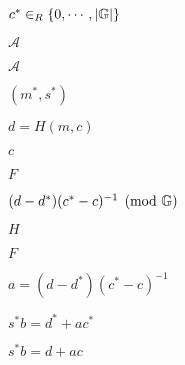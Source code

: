 \documentclass[10pt]{book}
\begin{document}
\begin{mdSnippets}
\begin{mdInlineSnippet}[49c145525d29d15a616c70c43bff860b]
$c^* \in_R \{0, \cdots, |\mathbb{G}|\}$\end{mdInlineSnippet}%
\begin{mdInlineSnippet}[ad70146b431bea9ae74cf8385470c544]%
$\mathcal{A}$\end{mdInlineSnippet}%
\begin{mdInlineSnippet}[ad70146b431bea9ae74cf8385470c544]%
$\mathcal{A}$\end{mdInlineSnippet}%
\begin{mdInlineSnippet}%
$(m^*,s^*)$\end{mdInlineSnippet}%
\begin{mdInlineSnippet}[d6216479ec0480c899cf57ac7f86cf11]%
$d = H(m,c)$\end{mdInlineSnippet}%
\begin{mdInlineSnippet}[4a8a08f09d37b73795649038408b5f33]%
$c$\end{mdInlineSnippet}%
\begin{mdInlineSnippet}[800618943025315f869e4e1f09471012]%
$F$\end{mdInlineSnippet}%
\begin{mdInlineSnippet}%
$(d-d^*)(c^* - c)^{-1} \pmod{\mathbb{G}}$\end{mdInlineSnippet}%
\begin{mdInlineSnippet}[c1d9f50f86825a1a2302ec2449c17196]%
$H$\end{mdInlineSnippet}%
\begin{mdInlineSnippet}[800618943025315f869e4e1f09471012]%
$F$\end{mdInlineSnippet}%
\begin{mdInlineSnippet}[a29582f37b37056784cc64eea8b83d93]%
$a = (d-d^*)(c^* - c)^{-1}$\end{mdInlineSnippet}%
\begin{mdInlineSnippet}%
$s^*b = d^* + ac^*$\end{mdInlineSnippet}%
\begin{mdInlineSnippet}[4d61ea1576a179e49f4a6d70acb0f108]%
$s^*b = d + ac$\end{mdInlineSnippet}%
\begin{mdInlineSnippet}[6bb88234af389d7432e135ad3d41fd2c]%

\end{mdInlineSnippet}
\end{mdSnippets}
\end{document}

